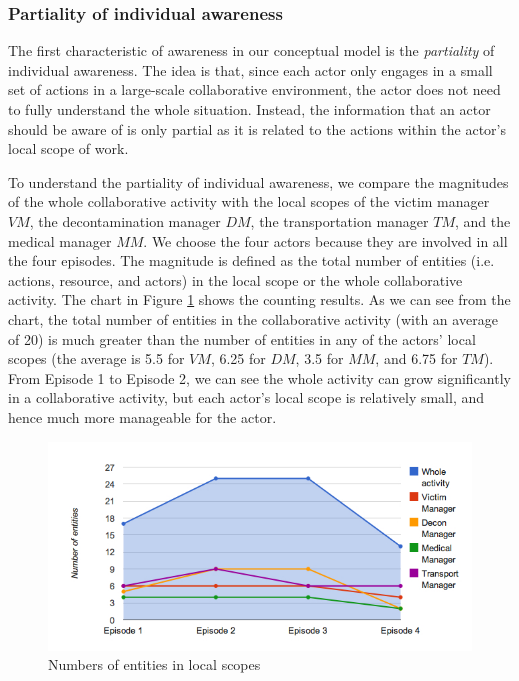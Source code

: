 \subsubsection{Partiality of individual awareness} %
\label{ssub:partiality_of_awareness}
The first characteristic of awareness in our conceptual model is the \emph{partiality} of individual awareness. The idea is that, since each actor only engages in a small set of actions in a large-scale collaborative environment, the actor does not need to fully understand the whole situation. Instead, the information that an actor should be aware of is only partial as it is related to the actions within the actor's local scope of work.

To understand the partiality of individual awareness, we compare the magnitudes of the whole collaborative activity with the local scopes of the victim manager $VM$, the decontamination manager $DM$, the transportation manager $TM$, and the medical manager $MM$. We choose the four actors because they are involved in all the four episodes. The magnitude is defined as the total number of entities (i.e. actions, resource, and actors) in the local scope or the whole collaborative activity. The chart in Figure \ref{fig:partiality_of_awareness_case} shows the counting results. As we can see from the chart, the total number of entities in the collaborative activity (with an average of 20) is much greater than the number of entities in any of the actors' local scopes (the average is 5.5 for $VM$, 6.25 for $DM$, 3.5 for $MM$, and 6.75 for $TM$). From Episode 1 to Episode 2, we can see the whole activity can grow significantly in a collaborative activity, but each actor's local scope is relatively small, and hence much more manageable for the actor.

\begin{figure}[htbp] %
	\centering
	\includegraphics[width=5.8in]{partiality_of_awareness_case.jpg} 
	\caption{Numbers of entities in local scopes}
	\label{fig:partiality_of_awareness_case}
\end{figure}

